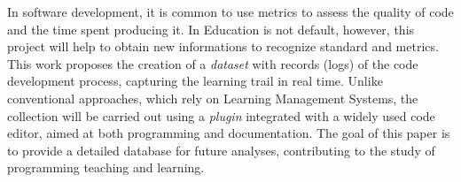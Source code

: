 
\begin{abstractutfpr}%
In software development, it is common to use metrics to assess the quality of code and the time spent producing it. In Education is not default, however, this project will help to obtain new informations to recognize standard and metrics. This work proposes the creation of a \textit{dataset} with records (logs) of the code development process, capturing the learning trail in real time. Unlike conventional approaches, which rely on Learning Management Systems, the collection will be carried out using a \textit{plugin} integrated with a widely used code editor, aimed at both programming and documentation. The goal of this paper is to provide a detailed database for future analyses, contributing to the study of programming teaching and learning.
\end{abstractutfpr}
